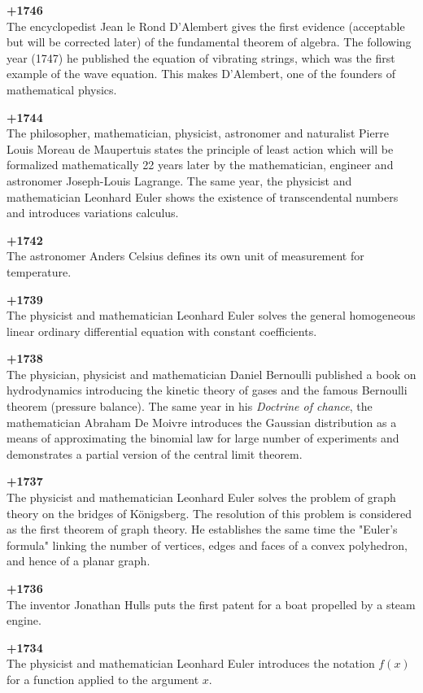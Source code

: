 \textbf{+1746}\\
The encyclopedist Jean le Rond D'Alembert gives the first evidence (acceptable but will be corrected later) of the fundamental theorem of algebra. The following year (1747) he published the equation of vibrating strings, which was the first example of the wave equation. This makes D'Alembert, one of the founders of mathematical physics.

\textbf{+1744}\\
The philosopher, mathematician, physicist, astronomer and naturalist Pierre Louis Moreau de Maupertuis states the principle of least action which will be formalized mathematically 22 years later by the mathematician, engineer and astronomer Joseph-Louis Lagrange. The same year, the physicist and mathematician Leonhard Euler shows the existence of transcendental numbers and introduces variations calculus.

\textbf{+1742}\\
The astronomer Anders Celsius defines its own unit of measurement for temperature.

\textbf{+1739}\\
The physicist and mathematician Leonhard Euler solves the general homogeneous linear ordinary differential equation with constant coefficients.

\textbf{+1738}\\
The physician, physicist and mathematician Daniel Bernoulli published a book on hydrodynamics introducing the kinetic theory of gases and the famous Bernoulli theorem (pressure balance). The same year in his \textit{Doctrine of chance}, the mathematician Abraham De Moivre introduces the Gaussian distribution as a means of approximating the binomial law for large number of experiments and demonstrates a partial version of the central limit theorem.

\textbf{+1737}\\
The physicist and mathematician Leonhard Euler solves the problem of graph theory on the bridges of Königsberg. The resolution of this problem is considered as the first theorem of graph theory. He establishes the same time the "Euler's formula" linking the number of vertices, edges and faces of a convex polyhedron, and hence of a planar graph.

\textbf{+1736}\\
The inventor Jonathan Hulls puts the first patent for a boat propelled by a steam engine.

\textbf{+1734}\\
The physicist and mathematician Leonhard Euler introduces the notation $f(x)$ for a function applied to the argument $x$.

